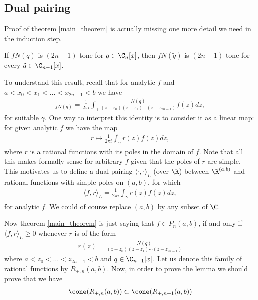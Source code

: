 \subsection{Dual pairing}

Proof of theorem \ref{main_theorem} is actually missing one more detail we need in the induction step.

\begin{lem}\label{k_tone_cor}
	If $f N(q)$ is $(2 n + 1)$-tone for $q \in \C_{n}[x]$, then $f N(\tilde{q})$ is $(2 n - 1)$-tone for every $\tilde{q} \in \C_{n - 1}[x]$.
\end{lem}

To understand this result, recall that for analytic $f$ and $a < x_{0} < x_{1} < \ldots < x_{2 n - 1} < b$ we have
\begin{align*}
	[x_{0}, x_{1}, \ldots, x_{2 n - 1}]_{f N(q)} = \frac{1}{2 \pi i} \int_{\gamma} \frac{N(q)}{(z - z_{0}) (z - z_{1}) \cdots (z - z_{2 n - 1})} f(z) dz,
\end{align*}
for suitable $\gamma$. One way to interpret this identity is to consider it as a linear map: for given analytic $f$ we have the map
\begin{align*}
	r \mapsto  \frac{1}{2 \pi i} \int_{\gamma} r(z) f(z) dz,
\end{align*}
where $r$ is a rational functions with its poles in the domain of $f$. Note that all this makes formally sense for arbitrary $f$ given that the poles of $r$ are simple. This motivates us to define a dual pairing $\langle \cdot, \cdot \rangle_{L}$ (over $\R$) between $\R^{(a, b)}$ and rational functions with simple poles on $(a, b)$, for which
\begin{align*}
	\langle f, r \rangle_{L} = \frac{1}{2 \pi i} \int_{\gamma} r(z) f(z) dz,
\end{align*}
for analytic $f$. We could of course replace $(a, b)$ by any subset of $\C$.

Now theorem \ref{main_theorem} is just saying that $f \in P_{n}(a, b)$, if and only if $\langle f, r \rangle_{L} \geq 0$ whenever $r$ is of the form
\begin{align*}
	r(z) = \frac{N(q)}{(z - z_{0}) (z - z_{1}) \cdots (z - z_{2 n - 1})}
\end{align*}
where $a < z_{0} < \ldots < z_{2 n - 1} < b$ and $q \in \C_{n - 1}[x]$. Let us denote this family of rational functions by $R_{+, n}(a, b)$. Now, in order to prove the lemma we should prove that we have
\begin{align*}
	\cone(R_{+, n}(a, b)) \subset \cone(R_{+, n + 1}(a, b))
\end{align*}

